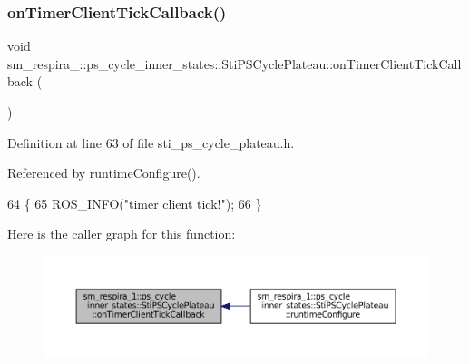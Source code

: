 \subsubsection{\texorpdfstring{on\+Timer\+Client\+Tick\+Callback()}{onTimerClientTickCallback()}}
{\footnotesize\ttfamily void sm\+\_\+respira\+\_\+::ps\+\_\+cycle\+\_\+inner\+\_\+states\+::\+Sti\+P\+S\+Cycle\+Plateau\+::on\+Timer\+Client\+Tick\+Callback (\begin{DoxyParamCaption}{ }\end{DoxyParamCaption})\hspace{0.3cm}{\ttfamily [inline]}}



Definition at line 63 of file sti\+\_\+ps\+\_\+cycle\+\_\+plateau.\+h.



Referenced by runtime\+Configure().


\begin{DoxyCode}
64   \{
65     ROS\_INFO(\textcolor{stringliteral}{"timer client tick!"});
66   \}
\end{DoxyCode}
Here is the caller graph for this function\+:
\nopagebreak
\begin{figure}[H]
\begin{center}
\leavevmode
\includegraphics[width=350pt]{structsm__respira__1_1_1ps__cycle__inner__states_1_1StiPSCyclePlateau_a474f210a65f1b5769b4debd1e2d555f8_icgraph}
\end{center}
\end{figure}
\mbox{\label{structsm__respira__1_1_1ps__cycle__inner__states_1_1StiPSCyclePlateau_a863e247bf1710ebd5350f61c7264db42}} 
